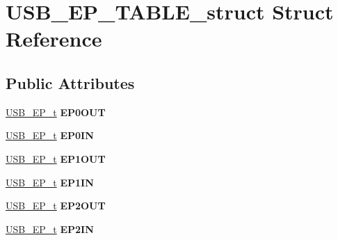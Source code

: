 \hypertarget{struct_u_s_b___e_p___t_a_b_l_e__struct}{}\section{U\+S\+B\+\_\+\+E\+P\+\_\+\+T\+A\+B\+L\+E\+\_\+struct Struct Reference}
\label{struct_u_s_b___e_p___t_a_b_l_e__struct}
\subsection*{Public Attributes}
\begin{DoxyCompactItemize}
\item 
\hyperlink{struct_u_s_b___e_p__struct}{U\+S\+B\+\_\+\+E\+P\+\_\+t} {\bfseries E\+P0\+O\+UT}\hypertarget{struct_u_s_b___e_p___t_a_b_l_e__struct_ae4f46cf3c6d6fb56d106df3bbc7fe84d}{}\label{struct_u_s_b___e_p___t_a_b_l_e__struct_ae4f46cf3c6d6fb56d106df3bbc7fe84d}

\item 
\hyperlink{struct_u_s_b___e_p__struct}{U\+S\+B\+\_\+\+E\+P\+\_\+t} {\bfseries E\+P0\+IN}\hypertarget{struct_u_s_b___e_p___t_a_b_l_e__struct_aa44c7baf6dbcdf91a020e0dafa8d2c5c}{}\label{struct_u_s_b___e_p___t_a_b_l_e__struct_aa44c7baf6dbcdf91a020e0dafa8d2c5c}

\item 
\hyperlink{struct_u_s_b___e_p__struct}{U\+S\+B\+\_\+\+E\+P\+\_\+t} {\bfseries E\+P1\+O\+UT}\hypertarget{struct_u_s_b___e_p___t_a_b_l_e__struct_a263bf3b4880fb7f5ffb60b317e484d7a}{}\label{struct_u_s_b___e_p___t_a_b_l_e__struct_a263bf3b4880fb7f5ffb60b317e484d7a}

\item 
\hyperlink{struct_u_s_b___e_p__struct}{U\+S\+B\+\_\+\+E\+P\+\_\+t} {\bfseries E\+P1\+IN}\hypertarget{struct_u_s_b___e_p___t_a_b_l_e__struct_a66e4e03d77a41558421a37e68d844b1e}{}\label{struct_u_s_b___e_p___t_a_b_l_e__struct_a66e4e03d77a41558421a37e68d844b1e}

\item 
\hyperlink{struct_u_s_b___e_p__struct}{U\+S\+B\+\_\+\+E\+P\+\_\+t} {\bfseries E\+P2\+O\+UT}\hypertarget{struct_u_s_b___e_p___t_a_b_l_e__struct_a213342a85cbe4366fb4202efef1c157d}{}\label{struct_u_s_b___e_p___t_a_b_l_e__struct_a213342a85cbe4366fb4202efef1c157d}

\item 
\hyperlink{struct_u_s_b___e_p__struct}{U\+S\+B\+\_\+\+E\+P\+\_\+t} {\bfseries E\+P2\+IN}\hypertarget{struct_u_s_b___e_p___t_a_b_l_e__struct_a758bb0a9f66cf61761f046538203ab9c}{}\label{struct_u_s_b___e_p___t_a_b_l_e__struct_a758bb0a9f66cf61761f046538203ab9c}


\end{DoxyCompactItemize}
